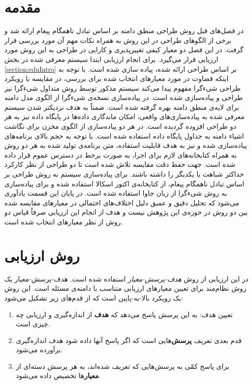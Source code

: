 \section{مقدمه}
در فصل‌های قبل روش طراحی منطق دامنه بر اساس تبادل ناهمگام پیغام ارائه شد و برخی از الگوهای طراحی در این روش به همراه نکات مهم آن مورد بررسی قرار گرفت. در این فصل دو معیار کیفی تغییرپذیری و کارایی در طراحی به این روش مورد ارزیابی قرار می‌گیرد. برای انجام ارزیابی ابتدا سیستم معرفی شده در بخش \ref{section:eduIntro} بر اساس طراحی ارائه شده، پیاده سازی شده است. با توجه به اینکه قضاوت در مورد معیارهای انتخاب شده برای بررسی، در مقایسه با رویکرد طراحی شیءگرا مفهوم پیدا می‌کند سیستم مذکور توسط روش متداول شیءگرا نیز طراحی و پیاده‌سازی شده است. در پیاده‌سازی نسخه‌ی شیءگرا از الگوی مدل دامنه \cite{Fowler_Patterns} برای لایه‌ی منطق دامنه بهره گرفته شده است. ضمناً به هدف نزدیکتر شدن سیستم معرفی شده به پیاده‌سازی‌های واقعی، امکان ماندگاری داده‌ها در پایگاه داده نیز به هر دو طراحی افزوده گردیده است. در هر دو پیاده‌سازی از الگوی \gls{مخزن}\cite{Fowler_Patterns} برای نگاشت اشیاء دامنه به جداول پایگاه داده استفاده شده است.
با توجه به حجم بالای برنامه‌های پیاده‌سازی شده و نیز به هدف قابلیت استفاده‌، متن برنامه‌ی تولید شده به هر دو روش به همراه کتابخانه‌های لازم برای اجرا، به صورت برخط در دسترس عموم قرار داده شده‌ است\cite{sources_java,sources_scala}. جهت حفظ دقت مقایسه تلاش شده است تا دو طراحی از نظر کارکرد حداکثر شباهت با یکدیگر را داشته باشند. برای پیاده‌سازی سیستم به روش طراحی بر اساس تبادل ناهمگام پیغام، از کتابخانه‌ی اکتور اسکالا استفاده شده و برای پیاده‌سازی به روش شیءگرا از زبان جاوا استفاده شده است. در پایان این قسمت یادآوری می‌شود که تحلیل دقیق و عمیق دلیل اختلاف‌های احتمالی در معیارهای مقایسه شده بین دو روش در حوزه‌ی این پژوهش نیست و هدف از انجام این ارزیابی صرفاً قیاس دو روش از نظر معیارهای انتخاب شده است.
\section{روش ارزیابی}
\label{section:gqm}
در این ارزیابی از روش \textit{هدف-پرسش-معیار} استفاده شده است. هدف-پرسش-معیار یک روش نظام‌مند برای تعیین معیارهای ارزیابی متناسب با دامنه‌ی مسئله است. این روش یک رویکرد بالا-به-پایین است که از قدم‌های زیر تشکیل می‌شود:\cite{GQM}
\begin{enumerate}
\item تعیین هدف: به این پرسش پاسخ می‌دهد که \textbf{هدف} از اندازه‌گیری  و ارزیابی چه چیزی است.
\item قدم بعدی تعریف \textbf{پرسش‌}هایی است که اگر پاسخ آنها داده شود هدف اندازه‌گیری برآورده می‌شود.
\item برای پاسخ کمّی به پرسش‌هایی که تعریف شده‌اند، به هر پرسش دسته‌ای از \textbf{معیار}ها تخصیص داده می‌شود.
\end{enumerate}

